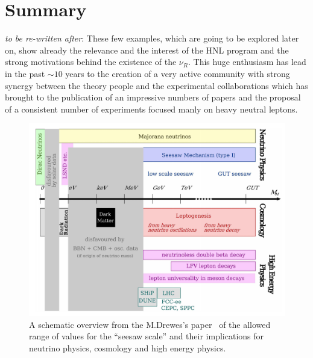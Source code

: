\clearpage

\section{Summary}
\emph{to be re-written after}:
These few examples, which are going to be explored later on, show already the relevance and the interest of the HNL program and the strong motivations behind the existence of the $\nu_{R}$. This huge enthusiasm has lead in the past $\sim10$ years to the creation of a very active community with strong synergy between the theory people and the experimental collaborations which has brought to the publication of an impressive numbers of papers and the proposal of a consistent number of experiments focused manly on heavy neutral leptons. 

\begin{figure}[h]
  \centering
  \includegraphics[width=.99\textwidth]{Figures/c3/marcoscheme.png}
    \caption{A schematic overview from the M.Drewes's
      paper~\cite{DREWES2017250} of the allowed range of values for
      the “seesaw scale” and their implications for neutrino physics, cosmology and high
energy physics.}
  \label{fig:marcoscheme}
\end{figure}




\clearpage

